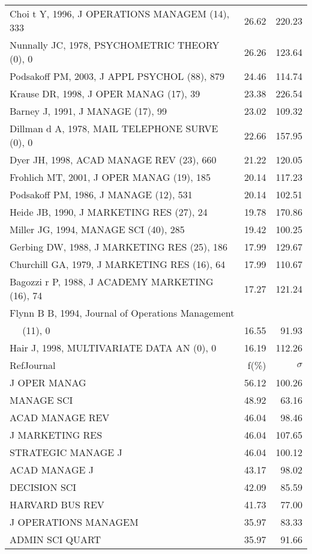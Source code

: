 \documentclass[a4paper,11pt]{report}
\begin{document}
\begin{landscape}
\begin{table}[!ht]
{\begin{tabular}{|l r r|}
Choi t Y, 1996, J OPERATIONS MANAGEM (14), 333 & 26.62 & 220.23\\
Nunnally JC, 1978, PSYCHOMETRIC THEORY (0), 0 & 26.26 & 123.64\\
Podsakoff PM, 2003, J APPL PSYCHOL (88), 879 & 24.46 & 114.74\\
Krause DR, 1998, J OPER MANAG (17), 39 & 23.38 & 226.54\\
Barney J, 1991, J MANAGE (17), 99 & 23.02 & 109.32\\
Dillman d A, 1978, MAIL TELEPHONE SURVE (0), 0 & 22.66 & 157.95\\
Dyer JH, 1998, ACAD MANAGE REV (23), 660 & 21.22 & 120.05\\
Frohlich MT, 2001, J OPER MANAG (19), 185 & 20.14 & 117.23\\
Podsakoff PM, 1986, J MANAGE (12), 531 & 20.14 & 102.51\\
Heide JB, 1990, J MARKETING RES (27), 24 & 19.78 & 170.86\\
Miller JG, 1994, MANAGE SCI (40), 285 & 19.42 & 100.25\\
Gerbing DW, 1988, J MARKETING RES (25), 186 & 17.99 & 129.67\\
Churchill GA, 1979, J MARKETING RES (16), 64 & 17.99 & 110.67\\
Bagozzi r P, 1988, J ACADEMY MARKETING (16), 74 & 17.27 & 121.24\\
Flynn B B, 1994, Journal of Operations Management &  & \\
$\quad$ (11), 0 & 16.55 & 91.93\\
Hair J, 1998, MULTIVARIATE DATA AN (0), 0 & 16.19 & 112.26\\
\hline
\hline
RefJournal & f(\%) & $\sigma$\\
\hline
J OPER MANAG & 56.12 & 100.26\\
MANAGE SCI & 48.92 & 63.16\\
ACAD MANAGE REV & 46.04 & 98.46\\
J MARKETING RES & 46.04 & 107.65\\
STRATEGIC MANAGE J & 46.04 & 100.12\\
ACAD MANAGE J & 43.17 & 98.02\\
DECISION SCI & 42.09 & 85.59\\
HARVARD BUS REV & 41.73 & 77.00\\
J OPERATIONS MANAGEM & 35.97 & 83.33\\
ADMIN SCI QUART & 35.97 & 91.66\\
\hline
\end{tabular}
}
\end{table}


\end{landscape}
\end{document}
